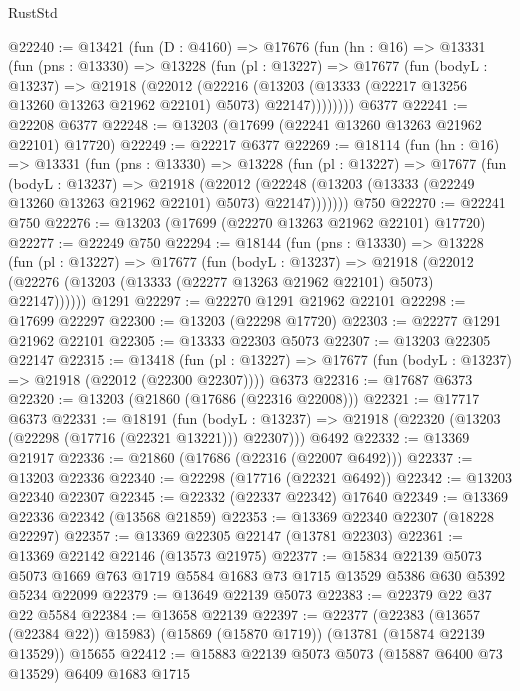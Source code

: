 \begin{lexlean}{RustStd}
\begin{coremodule}
@22240 := @13421
    (fun (D : @4160) =>
    @17676
      (fun (hn : @16) =>
      @13331
        (fun (pns : @13330) =>
        @13228
          (fun (pl : @13227) =>
          @17677
            (fun (bodyL : @13237) =>
            @21918
              (@22012
                (@22216
                  (@13203 (@13333 (@22217 @13256 @13260 @13263 @21962 @22101) @5073) @22147))))))))
    @6377
@22241 := @22208 @6377
@22248 := @13203 (@17699 (@22241 @13260 @13263 @21962 @22101) @17720)
@22249 := @22217 @6377
@22269 := @18114
    (fun (hn : @16) =>
    @13331
      (fun (pns : @13330) =>
      @13228
        (fun (pl : @13227) =>
        @17677
          (fun (bodyL : @13237) =>
          @21918
            (@22012
              (@22248 (@13203 (@13333 (@22249 @13260 @13263 @21962 @22101) @5073) @22147)))))))
    @750
@22270 := @22241 @750
@22276 := @13203 (@17699 (@22270 @13263 @21962 @22101) @17720)
@22277 := @22249 @750
@22294 := @18144
    (fun (pns : @13330) =>
    @13228
      (fun (pl : @13227) =>
      @17677
        (fun (bodyL : @13237) =>
        @21918 (@22012 (@22276 (@13203 (@13333 (@22277 @13263 @21962 @22101) @5073) @22147))))))
    @1291
@22297 := @22270 @1291 @21962 @22101
@22298 := @17699 @22297
@22300 := @13203 (@22298 @17720)
@22303 := @22277 @1291 @21962 @22101
@22305 := @13333 @22303 @5073
@22307 := @13203 @22305 @22147
@22315 := @13418
    (fun (pl : @13227) => @17677 (fun (bodyL : @13237) => @21918 (@22012 (@22300 @22307))))
    @6373
@22316 := @17687 @6373
@22320 := @13203 (@21860 (@17686 (@22316 @22008)))
@22321 := @17717 @6373
@22331 := @18191
    (fun (bodyL : @13237) => @21918 (@22320 (@13203 (@22298 (@17716 (@22321 @13221))) @22307)))
    @6492
@22332 := @13369 @21917
@22336 := @21860 (@17686 (@22316 (@22007 @6492)))
@22337 := @13203 @22336
@22340 := @22298 (@17716 (@22321 @6492))
@22342 := @13203 @22340 @22307
@22345 := @22332 (@22337 @22342) @17640
@22349 := @13369 @22336 @22342 (@13568 @21859)
@22353 := @13369 @22340 @22307 (@18228 @22297)
@22357 := @13369 @22305 @22147 (@13781 @22303)
@22361 := @13369 @22142 @22146 (@13573 @21975)
@22377 := @15834
    @22139
    @5073
    @5073
    @1669
    @763
    @1719
    @5584
    @1683
    @73
    @1715
    @13529
    @5386
    @630
    @5392
    @5234
    @22099
@22379 := @13649 @22139 @5073
@22383 := @22379 @22 @37 @22 @5584
@22384 := @13658 @22139
@22397 := @22377
    (@22383 (@13657 (@22384 @22)) @15983)
    (@15869 (@15870 @1719))
    (@13781 (@15874 @22139 @13529))
    @15655
@22412 := @15883
    @22139
    @5073
    @5073
    (@15887 @6400 @73 @13529)
    @6409
    @1683
    @1715

\end{coremodule}
\end{lexlean}
